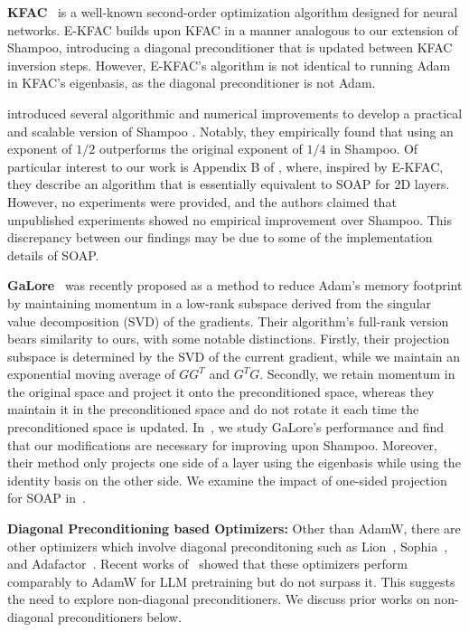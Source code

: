 \documentclass{article} %
\begin{document}
\textbf{KFAC}~\citep{martens15} is a well-known second-order optimization algorithm designed 
for neural networks. E-KFAC \citep{ekfac} builds upon KFAC in a manner analogous to 
our extension of Shampoo, introducing a diagonal preconditioner that is updated 
between KFAC inversion steps. However, E-KFAC's algorithm is not identical to running 
Adam in KFAC’s eigenbasis, as the diagonal preconditioner is not Adam.

\citet{anil2020scalable} introduced several algorithmic and numerical improvements to 
develop a practical and scalable version of Shampoo \citep{shampoo}. Notably, they 
empirically found that using an exponent of $1/2$ outperforms the original exponent 
of $1/4$ in Shampoo. Of particular interest to our work is Appendix B of 
\citet{anil2020scalable}, where, inspired by E-KFAC, they describe an algorithm that 
is essentially equivalent to SOAP for 2D layers. However, no experiments were 
provided, and the authors claimed that unpublished experiments showed no empirical 
improvement over Shampoo. This discrepancy between our findings may be due to some of the implementation details of SOAP.

\textbf{GaLore}~\citep{galore} was recently proposed as a method to reduce Adam's memory footprint by 
maintaining momentum in a low-rank subspace derived from the singular value 
decomposition (SVD) of the gradients. Their algorithm’s full-rank version bears 
similarity to ours, with some notable distinctions. Firstly, their projection subspace is 
determined by the SVD of the current gradient, while we maintain an exponential moving 
average of $GG^T$ and $G^TG$. Secondly, we retain momentum in the original space and 
project it onto the preconditioned space, whereas they maintain it in the preconditioned 
space and do not rotate it each time the preconditioned space is updated. In~, we study GaLore's performance and find that our modifications are necessary for improving upon Shampoo. Moreover, their method 
only projects one side of a layer using the eigenbasis while using the identity basis on the other side. We examine the impact of one-sided 
projection for SOAP in~.


\textbf{Diagonal Preconditioning based Optimizers:} Other than AdamW, there are other optimizers which involve diagonal preconditoning such as Lion~\citep{lion}, Sophia~\citep{liu2024sophia}, and Adafactor~\citep{adafactor}. Recent works of~\citet{KaddourKNMK23,zhaoscience} showed that these optimizers perform comparably to AdamW for LLM pretraining but do not surpass it. This suggests the need to explore non-diagonal preconditioners. We discuss prior works on non-diagonal preconditioners below.
\end{document}
